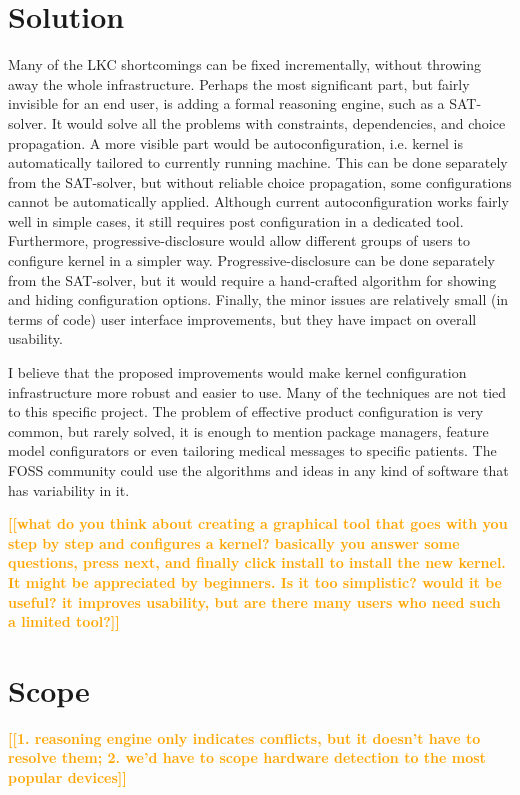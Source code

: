 \documentclass{chi2009}
\newcommand{\todo}[1]{\textsf{\textbf{\textcolor{Orange}{[[#1]]}}}}
\begin{document}
\section{Solution}
Many of the LKC shortcomings can be fixed incrementally, without throwing away the whole infrastructure. Perhaps the most significant part, but fairly invisible for an end user, is adding a formal reasoning engine, such as a SAT-solver. It would solve all the problems with constraints, dependencies, and choice propagation. A more visible part would be autoconfiguration, i.e. kernel is automatically tailored to currently running machine. This can be done separately from the SAT-solver, but without reliable choice propagation, some configurations cannot be automatically applied. Although current autoconfiguration works fairly well in simple cases, it still requires post configuration in a dedicated tool. Furthermore, progressive-disclosure would allow different groups of users to configure kernel in a simpler way. Progressive-disclosure can be done separately from the SAT-solver, but it would require a hand-crafted algorithm for showing and hiding configuration options. Finally, the minor issues are relatively small (in terms of code) user interface improvements, but they have impact on overall usability.

I believe that the proposed improvements would make kernel configuration infrastructure more robust and easier to use. Many of the techniques are not tied to this specific project. The problem of effective product configuration is very common, but rarely solved, it is enough to mention package managers, feature model configurators or even tailoring medical messages to specific patients. The FOSS community could use the algorithms and ideas in any kind of software that has variability in it.

\todo{what do you think about creating a graphical tool that goes with you step by step and configures a kernel? basically you answer some questions, press next, and finally click install to install the new kernel. It might be appreciated by beginners. Is it too simplistic? would it be useful? it improves usability, but are there many users who need such a limited tool?}

\section{Scope}

\todo{1. reasoning engine only indicates conflicts, but it doesn't have to resolve them; 2. we'd have to scope hardware detection to the most popular devices}
\end{document}
